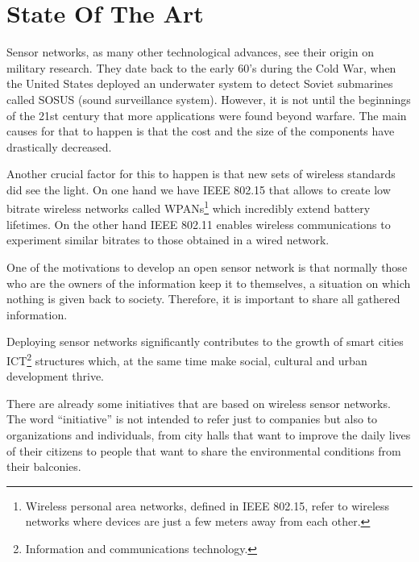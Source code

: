 \chapter{State Of The Art} %

\label{Chapter2} %



Sensor networks, as many other technological advances, see their origin on military research. They date back to the early 60's during the Cold War, when the United States deployed an underwater system to detect Soviet submarines called SOSUS (sound surveillance system). However, it is not until the beginnings of the 21st century that more applications were found beyond warfare. The main causes for that to happen is that the cost and the size of the components have drastically decreased.

Another crucial factor for this to happen is that new sets of wireless standards did see the light. On one hand we have IEEE 802.15 that allows to create low bitrate wireless networks called WPANs\footnote{Wireless personal area networks, defined in IEEE 802.15, refer to wireless networks where devices are just a few meters away from each other.} which incredibly extend battery lifetimes. On the other hand IEEE 802.11 enables wireless communications to experiment similar bitrates to those obtained in a wired network.

One of the motivations to develop an open sensor network is that normally those who are the owners of the information keep it to themselves, a situation on which nothing is given back to society. Therefore, it is important to share all gathered information.

Deploying sensor networks significantly contributes to the growth of smart cities ICT\footnote{Information and communications technology.} structures which, at the same time make social, cultural and urban development thrive\cite{caragliu2009smart}\cite{hollands2008will}.

There are already some initiatives that are based on wireless sensor networks. The word ``initiative'' is not intended to refer just to companies but also to organizations and individuals, from city halls that want to improve the daily lives of their citizens to people that want to share the environmental conditions from their balconies.

